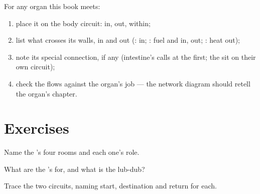 \begin{method}\label{met:g7:heart-and-circulation:map}
For any organ this book meets:
\begin{enumerate}
  \item place it on the body circuit:  in, 
        out,  within;
  \item list what crosses its  walls, in and
        out (:  in; : fuel and
         in,  out; : heat out);
  \item note its special connection, if any (intestine's
         calls at the  first; the  sit on
        their own circuit);
  \item check the flows against the organ's job --- the
        network diagram should retell the organ's
        chapter.
\end{enumerate}
\end{method}

\section{Exercises}

\begin{exercise}[$\star$]\label{exo:g7:heart-and-circulation:1}
Name the 's four rooms and each one's role.
\end{exercise}

\begin{exercise}[$\star$]\label{exo:g7:heart-and-circulation:2}
What are the 's  for, and what is the
lub-dub?
\end{exercise}

\begin{exercise}[$\star$]\label{exo:g7:heart-and-circulation:3}
Trace the two circuits, naming start, destination and
return for each.
\end{exercise}

